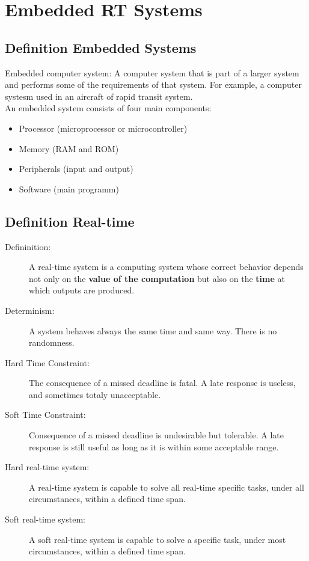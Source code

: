 \section{Embedded RT Systems}
\subsection{Definition Embedded Systems}
Embedded computer system: A computer system that is part of a larger system and performs some of the requirements of that system.
For example, a computer systesm used in an aircraft of rapid transit system.\\
An embedded system consists of four main components:
\begin{itemize}
  \item Processor (microprocessor or microcontroller)
  \item Memory (RAM and ROM)
  \item Peripherals (input and output)
  \item Software (main programm)
\end{itemize}

\subsection{Definition Real-time}
\begin{description}
  \item[Defininition:] A real-time system is a computing system whose correct behavior depends not only on the \textbf{value of the computation} but also on the \textbf{time} at which outputs are produced.
  \item[Determinism:] A system behaves always the same time and same way.
        There is no randomness.
  \item[Hard Time Constraint:] The consequence of a missed deadline is fatal.
        A late response is useless, and sometimes totaly unacceptable.
  \item [Soft Time Constraint:] Consequence of a missed deadline is undesirable but tolerable.
        A late response is still useful as long as it is within some acceptable range.
  \item [Hard real-time system:] A real-time system is capable to solve all real-time specific tasks, under all circumstances, within a defined time span.
  \item [Soft real-time system:] A soft real-time system is capable to solve a specific task, under most circumstances, within a defined time span.
\end{description}

